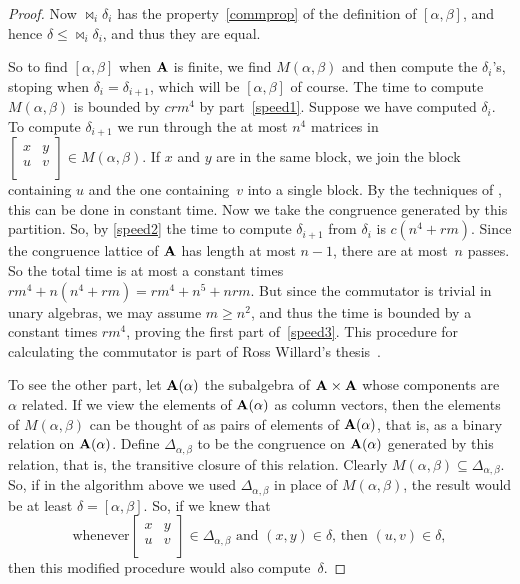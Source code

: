 \begin{proof}
Now $\Join_i \delta_i$ has the property~\eqref{commprop} of the
definition of $[\alpha,\beta]$,
and hence $\delta \le \Join_i \delta_i$, and thus they are equal.

So to find $[\alpha,\beta]$ when $\mathbf{A}$ is finite, we find
$M(\alpha,\beta)$ and then compute the $\delta_i$'s, stoping when
$\delta_i = \delta_{i+1}$, which will be $[\alpha,\beta]$ of course.
The time to compute $M(\alpha,\beta)$ is bounded by $crm^4$ by
part~\eqref{speed1}. Suppose we have computed $\delta_i$. To
compute $\delta_{i+1}$ we run through the at most $n^4$ matrices
in
$\begin{bmatrix}
x & y \\
u & v\\
\end{bmatrix} \in M(\alpha,\beta)$. If $x$ and $y$ are in the same
block, we join the block containing $u$ and the one containing~$v$
into a single block. By the techniques of \cite{Freese2008},
this can be done in constant time. Now we take the congruence generated
by this partition. So, by \eqref{speed2} the time to compute
$\delta_{i+1}$ from $\delta_i$ is $c(n^4 + rm)$. Since the congruence
lattice of $\mathbf{A}$ has length at most $n-1$, there are at most~$n$
passes. So the total time is at most a constant times
$rm^4 + n(n^4 + rm) = rm^4 + n^5 + nrm$.
But since the commutator is trivial in unary algebras, we may
assume $m \ge n^2$, and thus the time is bounded by a
constant times $rm^4$, proving the first part of~\eqref{speed3}.
This procedure for calculating the commutator is part
of Ross Willard's thesis~\cite{MR2637477}.

To see the other part,
let $\mathbf{A}(\alpha)$ the subalgebra
of $\mathbf{A} \times \mathbf{A}$ whose components are $\alpha$ related. If we
view the elements of $\mathbf{A}(\alpha)$ as column vectors, then the
elements of $M(\alpha,\beta)$ can be thought of as pairs of elements
of $\mathbf{A}(\alpha)$, that is, as a binary relation on $\mathbf{A}(\alpha)$.
Define $\Delta_{\alpha,\beta}$ to be the congruence on $\mathbf{A}(\alpha)$
generated by this relation, that is,
the transitive closure of this relation.
Clearly $M(\alpha,\beta) \subseteq
\Delta_{\alpha,\beta}$. So, if in the algorithm above we used
$\Delta_{\alpha,\beta}$ in place of $M(\alpha,\beta)$, the result
would be at least $\delta = [\alpha,\beta]$. So, if we knew that
\begin{equation}\label{deltaStatement}
\text{whenever
$\begin{bmatrix}
x & y \\
u & v\\
\end{bmatrix} \in \Delta_{\alpha,\beta}$ and $(x,y) \in \delta$,
then $(u,v) \in \delta$},
\end{equation}
then this modified procedure would also
compute~$\delta$.


\end{proof}
